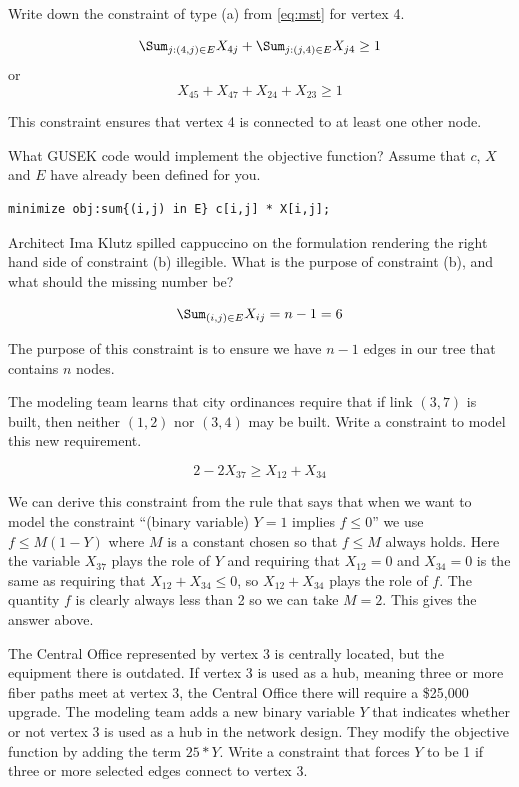 \begin{parts}
  
 Write down the constraint of type (a) from \eqref{eq:mst} for vertex 4.

\[  \Sum_{j:(4,j) \in E} X_{4j} +  \Sum_{j:(j,4) \in E} X_{j4} \ge 1 \]
or
\[ X_{45} + X_{47} + X_{24} + X_{23} \ge 1 \]

This constraint ensures that vertex 4 is connected to at least one other node.
\vfill

 What GUSEK code would implement the objective function? Assume that $c$, $X$ and $E$ have already been defined for you.  

\begin{verbatim}
minimize obj:sum{(i,j) in E} c[i,j] * X[i,j];
\end{verbatim}
\vfill

\newpage

 Architect Ima Klutz spilled cappuccino on the formulation rendering the right hand side of constraint (b) illegible.  What is the purpose of constraint (b), and what should the missing number be?

\[  \Sum_{(i,j) \in E} X_{ij} = n-1 = 6 \]

The purpose of this constraint is to ensure we have $n-1$ edges in our tree that contains $n$ nodes.
\vfill

 The modeling team learns that city ordinances require that if link $(3,7)$ is built, then neither $(1,2)$ nor $(3,4)$ may be built.  Write a constraint to model this new requirement.

\[ 2 - 2 X_{37} \ge X_{12} + X_{34} \]


We can derive this constraint from the rule that says that when we want to model the constraint ``(binary variable) $Y = 1$ implies $f \leq 0$'' we use  $f \leq M(1-Y)$ where $M$ is a constant chosen so that $f \leq M$ always holds. Here the variable $X_{37}$ plays the role of $Y$ and requiring that $X_{12} = 0$ and $X_{34}=0$ is the same as requiring that $X_{12}+X_{34} \leq 0$, so $X_{12}+X_{34}$ plays the role of $f$. The quantity $f$ is clearly always less than 2 so we can take $M = 2$. This gives the answer above. 

\vfill

 The Central Office represented by vertex 3 is centrally located, but the equipment there is outdated.  If vertex 3 is used as a hub, meaning three or more fiber paths meet at vertex 3, the Central Office there will require a \$25,000 upgrade.  The modeling team adds a new binary variable $Y$ that indicates whether or not vertex 3 is used as a hub in the network design.  They modify the objective function by adding the term $25*Y$.  Write a constraint that forces $Y$ to be 1 if three or more selected edges connect to vertex 3.


\end{parts}
